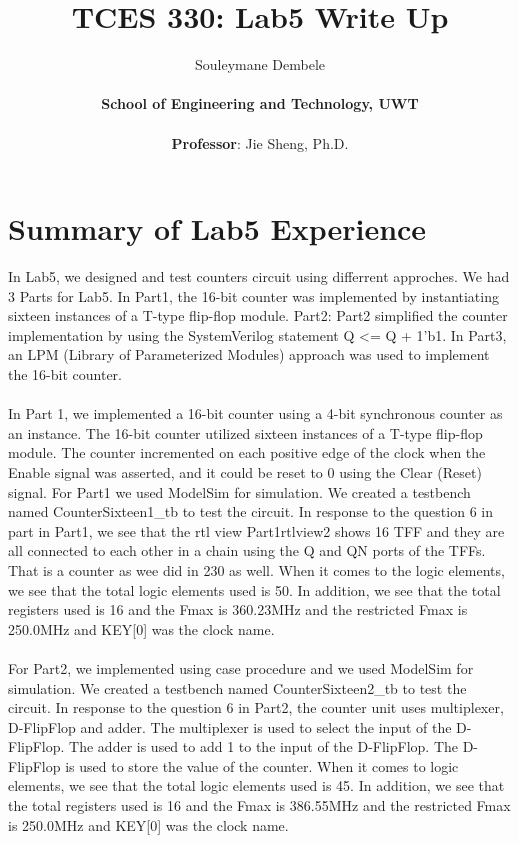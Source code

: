 \documentclass{article}
\title{\textbf{TCES 330: Lab5 Write Up}}
\author{Souleymane Dembele \\ \\ \textbf{School of Engineering and Technology, UWT} \\  \\ \textbf{Professor}:  Jie Sheng, Ph.D.}
\begin{document}
\maketitle

\section*{Summary of Lab5 Experience}
In Lab5, we designed and test counters circuit using differrent approches. We had 3 Parts for Lab5.
In Part1, the 16-bit counter was implemented by instantiating sixteen instances of a T-type flip-flop module.
Part2: Part2 simplified the counter implementation by using the SystemVerilog statement Q <= Q + 1'b1.
In Part3, an LPM (Library of Parameterized Modules) approach was used to implement the 16-bit counter.
\\\\
In Part 1, we implemented a 16-bit counter using a 4-bit synchronous counter as an instance. The 16-bit counter utilized sixteen instances of a T-type flip-flop module. 
The counter incremented on each positive edge of the clock when the Enable signal was asserted, and it could be reset to 0 using the Clear (Reset) signal.
For Part1  we used ModelSim for simulation. We created a testbench named CounterSixteen1\_tb to test the circuit. 
In response to the question 6 in part in Part1, we see that the rtl view Part1rtlview2 shows 16 TFF and they are all connected to each other in a chain using the Q and QN ports of the TFFs.
That is a counter as wee did in 230 as well.
When it comes to the logic elements, we see that the total logic elements used is 50. In addition, we see that the total registers used is 16 and the Fmax is 360.23MHz and the restricted Fmax is 250.0MHz and KEY[0] was the clock name.
\\\\
For Part2, we implemented using case procedure and we used ModelSim for simulation. We created a testbench named CounterSixteen2\_tb to test the circuit. 
In response to the question 6 in Part2, the counter unit uses multiplexer, D-FlipFlop and adder. The multiplexer is used to select the input of the D-FlipFlop. 
The adder is used to add 1 to the input of the D-FlipFlop. The D-FlipFlop is used to store the value of the counter.
When it comes to logic elements, we see that the total logic elements used is 45. In addition, we see that the total registers used is 16 and the Fmax is 386.55MHz and the restricted Fmax is 250.0MHz and KEY[0] was the clock name.
\\\\
\end{document}

